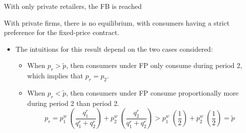 \documentclass{class}
\begin{document}
\begin{frame}{With only private retailers, the FB is reached}\label{PrivateFirms2}


\begin{lemma}
 With private firms, there is no equilibrium, with consumers having a strict preference for the fixed-price contract. 
\end{lemma}

\vfill

\begin{itemize}


\item The intuitions for this result depend on the two cases considered:
\vfill
\begin{itemize}
\item When $p_r > \tilde{p}$, then consumers under FP only consume during period 2, which implies that $p_r = p_2$. $\quad$ \hyperlink{mass_elec}{}
\vfill
\item When $p_r < \tilde{p}$, then consumers under FP consume proportionally more during period 2 than period 2. $\quad$ \hyperlink{qtt_elec2}{}
\vfill
\begin{equation*}
     p_r = p_1^w \; \left(\frac{ q_1^r}{ q_1^r + q_2^r }\right) + p_2^w \;  \left(\frac{q_2^r}{ q_1^r + q_2^r}\right) > p_1^w \;  \left(\frac{1}{2}\right)  +  p_2^w \;  \left(\frac{1}{2}\right) = \tilde{p}
\end{equation*}

 
\end{itemize}
\end{itemize}

\end{frame}

\end{document}
